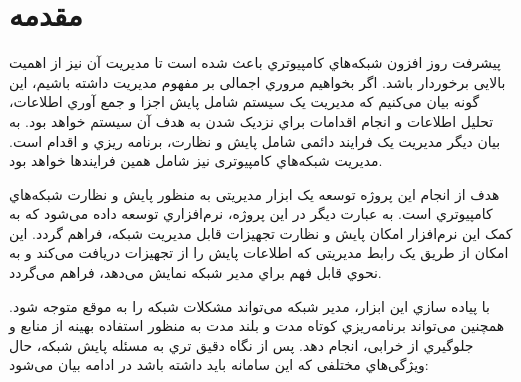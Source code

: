 \chapter{مقدمه}

پیشرفت روز افزون شبکه‌هاي کامپیوتري باعث شده است تا مدیریت آن نیز از اهمیت بالایی برخوردار باشد. اگر بخواهیم مروري اجمالی بر مفهوم مدیریت داشته باشیم، این گونه بیان می‌کنیم که مدیریت یک سیستم شامل پایش اجزا و جمع آوري اطلاعات، تحلیل اطلاعات و انجام اقدامات براي نزدیک شدن به هدف آن سیستم خواهد بود. به بیان دیگر مدیریت یک فرایند دائمی شامل پایش و نظارت، برنامه ریزي و اقدام است. مدیریت شبکه‌هاي کامپیوتری نیز شامل همین فرایندها خواهد بود.

هدف از انجام این پروژه توسعه یک ابزار مدیریتی به منظور پایش و نظارت شبکه‌هاي کامپیوتري است. به عبارت دیگر در این پروژه، نرم‌افزاري توسعه داده می‌شود که به کمک این نرم‌افزار امکان پایش و نظارت تجهیزات قابل مدیریت شبکه، فراهم گردد. این امکان از طریق یک رابط مدیریتی که اطلاعات پایش را از تجهیزات دریافت می‌کند و به نحوي قابل فهم براي مدیر شبکه نمایش می‌دهد، فراهم می‌گردد.

با پیاده سازي این ابزار، مدیر شبکه می‌تواند مشکلات شبکه را به موقع متوجه شود. همچنین می‌تواند برنامه‌ریزي کوتاه مدت و بلند مدت به منظور استفاده بهینه از منابع و جلوگیري از خرابی، انجام دهد. پس از نگاه دقیق تري به مسئله پایش شبکه، حال ویژگی‌هاي مختلفی که این سامانه باید داشته باشد در ادامه بیان می‌شود:

